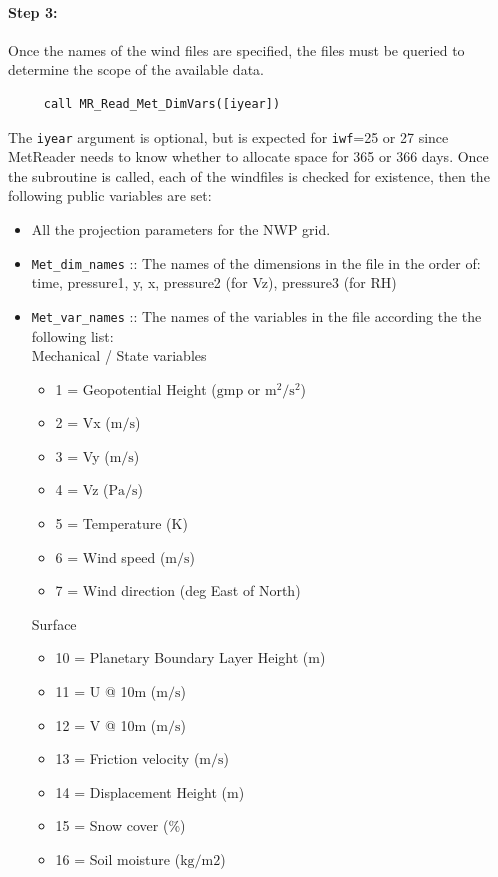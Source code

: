 \documentclass[11pt]{article}   %
\begin{document}
\paragraph{Step 3:} Once the names of the wind files are specified, the files must
be queried to determine the scope of the available data.
\begin{verbatim}
     call MR_Read_Met_DimVars([iyear])
\end{verbatim}
The \texttt{iyear} argument is optional, but is expected for \texttt{iwf}=25 or 27
since MetReader needs to know whether to allocate space for 365 or 366 days.
Once the subroutine is called, each of the windfiles is checked for existence, then
the following public variables are set:
\begin{itemize}
\item All the projection parameters for the NWP grid.
\item \texttt{Met\_dim\_names} :: The names of the dimensions in the file in the order of: time,
pressure1, y, x, pressure2 (for Vz), pressure3 (for RH)
\item \texttt{Met\_var\_names} :: The names of the variables in the file according the the
following list:
\\
 Mechanical / State variables
 \begin{itemize}
  \item 1 = Geopotential Height ($\mathrm{gmp}$ or $\mathrm{m^2/s^2}$)
  \item 2 = Vx ($\mathrm{m/s}$)
  \item 3 = Vy ($\mathrm{m/s}$)
  \item 4 = Vz ($\mathrm{Pa/s}$)
  \item 5 = Temperature ($\mathrm{K}$)
  \item 6 = Wind speed ($\mathrm{m/s}$)
  \item 7 = Wind direction (deg East of North)
 \end{itemize}
 Surface
 \begin{itemize}
  \item 10 = Planetary Boundary Layer Height ($\mathrm{m}$)
  \item 11 = U @ 10m ($\mathrm{m/s}$)
  \item 12 = V @ 10m ($\mathrm{m/s}$)
  \item 13 = Friction velocity ($\mathrm{m/s}$)
  \item 14 = Displacement Height ($\mathrm{m}$)
  \item 15 = Snow cover (\%)
  \item 16 = Soil moisture ($\mathrm{kg/m2}$)

\end{itemize}
\end{itemize}
\end{document}
